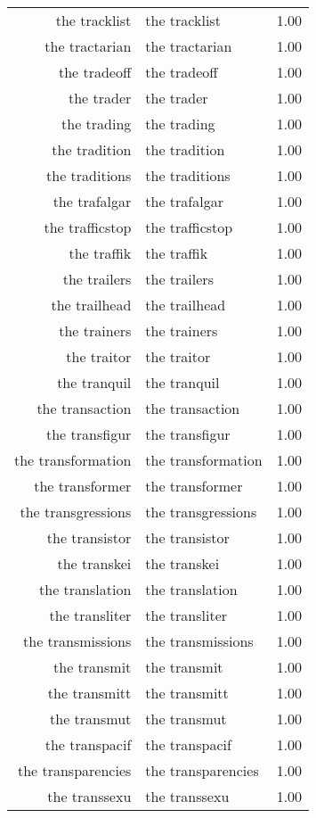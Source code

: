 \begin{table}[ht]
\begin{tabular}{rlr}
  the tracklist & the tracklist & 1.00 \\ 
  the tractarian & the tractarian & 1.00 \\ 
  the tradeoff & the tradeoff & 1.00 \\ 
  the trader & the trader & 1.00 \\ 
  the trading & the trading & 1.00 \\ 
  the tradition & the tradition & 1.00 \\ 
  the traditions & the traditions & 1.00 \\ 
  the trafalgar & the trafalgar & 1.00 \\ 
  the trafficstop & the trafficstop & 1.00 \\ 
  the traffik & the traffik & 1.00 \\ 
  the trailers & the trailers & 1.00 \\ 
  the trailhead & the trailhead & 1.00 \\ 
  the trainers & the trainers & 1.00 \\ 
  the traitor & the traitor & 1.00 \\ 
  the tranquil & the tranquil & 1.00 \\ 
  the transaction & the transaction & 1.00 \\ 
  the transfigur & the transfigur & 1.00 \\ 
  the transformation & the transformation & 1.00 \\ 
  the transformer & the transformer & 1.00 \\ 
  the transgressions & the transgressions & 1.00 \\ 
  the transistor & the transistor & 1.00 \\ 
  the transkei & the transkei & 1.00 \\ 
  the translation & the translation & 1.00 \\ 
  the transliter & the transliter & 1.00 \\ 
  the transmissions & the transmissions & 1.00 \\ 
  the transmit & the transmit & 1.00 \\ 
  the transmitt & the transmitt & 1.00 \\ 
  the transmut & the transmut & 1.00 \\ 
  the transpacif & the transpacif & 1.00 \\ 
  the transparencies & the transparencies & 1.00 \\ 
  the transsexu & the transsexu & 1.00 \\ 

\end{tabular}
\end{table}
